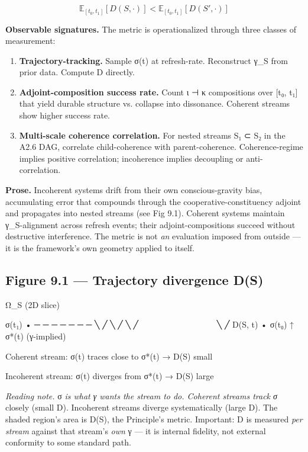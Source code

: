 \documentclass[11pt, openany]{book}
\begin{document}
$$\mathbb{E}_{[t_0, t_1]}[D(S, \cdot)] < \mathbb{E}_{[t_0, t_1]}[D(S', \cdot)]$$

\textbf{Observable signatures.} The metric is operationalized through three classes of measurement:

\begin{enumerate}
\item \textbf{Trajectory-tracking.} Sample σ(t) at refresh-rate. Reconstruct γ\_\allowbreak{}S from prior data. Compute D directly.
\item \textbf{Adjoint-composition success rate.} Count ι ⊣ κ compositions over [t₀, t₁] that yield durable structure vs. collapse into dissonance. Coherent streams show higher success rate.
\item \textbf{Multi-scale coherence correlation.} For nested streams S₁ ⊂ S₂ in the A2.6 DAG, correlate child-coherence with parent-coherence. Coherence-regime implies positive correlation; incoherence implies decoupling or anti-correlation.
\end{enumerate}

\textbf{Prose.} Incoherent systems drift from their own conscious-gravity bias, accumulating error that compounds through the cooperative-constituency adjoint and propagates into nested streams (see Fig 9.1). Coherent systems maintain γ\_\allowbreak{}S-alignment across refresh events; their adjoint-compositions succeed without destructive interference. The metric is not \textit{an} evaluation imposed from outside --- it is the framework's own geometry applied to itself.

\subsection{Figure 9.1 --- Trajectory divergence D(S)}

\begin{Code}
  Ω_S (2D slice)

    σ(t₁) • ─ ─ ─ ─ ─ ─ ─ ╲
               ╱              ╲
           ╱                    ╲
       ╱ ~ ~ ~ ~ ~ ~ ~ ~ ~ ~ ~   ╲
    ╱  D(S, t)                    • σ(t₀)
       ↑
    σ*(t) (γ-implied)

  Coherent stream:
        σ(t) traces close to σ*(t) → D(S) small

  Incoherent stream:
        σ(t) diverges from σ*(t) → D(S) large
\end{Code}

\textit{Reading note.} σ\textit{ is what γ wants the stream to do. Coherent streams track σ} closely (small D). Incoherent streams diverge systematically (large D). The shaded region's area is D(S), the Principle's metric. Important: D is measured \textit{per stream} against that stream's \textit{own} γ --- it is internal fidelity, not external conformity to some standard path.
\end{document}
